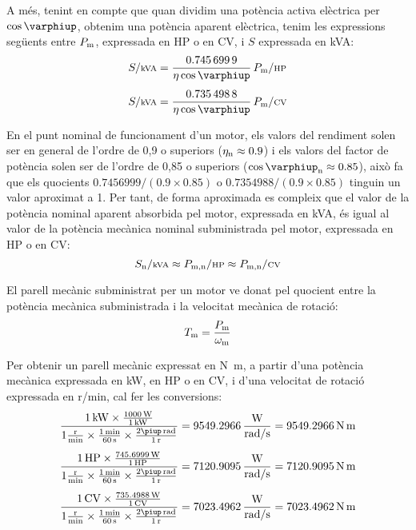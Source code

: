 A més, tenint en compte que quan dividim una potència activa elèctrica per $\cos\varphiup$, obtenim una potència aparent elèctrica, tenim les expressions següents entre $P\ped{m}$, expressada en HP o en CV, i $S$ expressada en kVA:
\begin{align}
    S/{\scriptstyle\si{kVA}} &= \frac{\num{0,7456999}}{\eta \cos\varphiup}\,   P\ped{m}/{\scriptstyle\si{HP}} \\[1ex]
    S/{\scriptstyle\si{kVA}} &= \frac{\num{0,7354988}}{\eta \cos\varphiup}\,   P\ped{m}/{\scriptstyle\si{CV}}
\end{align}

En el punt nominal de funcionament d'un motor, els valors del rendiment solen ser en general de l'ordre de 0,9 o superiors ($\eta\ped{n} \approx \num{0,9}$) i els valors del factor de potència solen ser de l'ordre de 0,85 o superiors ($\cos\varphiup\ped{n} \approx \num{0,85}$), això fa que els quocients $\num{0,7456999}/(\num{0,9} \times \num{0,85})$ o $\num{0,7354988}/(\num{0,9} \times \num{0,85})$ tinguin un valor aproximat a 1. Per tant, de forma aproximada es compleix que el valor de la potència nominal aparent absorbida pel motor, expressada en kVA, és igual al valor de la potència mecànica nominal subministrada pel motor, expressada en HP o en CV:
\begin{equation}\label{eq:kVA-CV-HP}
    S\ped{n}/{\scriptstyle \si{kVA}} \approx  P\ped{m,n}/{\scriptstyle \si{HP}} \approx  P\ped{m,n}/{\scriptstyle \si{CV}}
\end{equation}


El parell mecànic subministrat per un motor ve donat pel quocient entre la potència mecànica subministrada i la velocitat mecànica de rotació:
\begin{equation}\index{parell!mecànic}
    T\ped{m} = \frac{P\ped{m}}{\omega\ped{m}}\label{eq:T-P-w}
\end{equation}

Per  obtenir un  parell mecànic expressat en \si{N.m}, a partir d'una potència mecànica expressada en kW, en HP o en CV, i d'una velocitat de rotació expressada en \si{r/min}, cal  fer les conversions:
\begin{subequations}
\begin{align}
    \frac{\SI{1}{kW} \times \frac{\SI{1000}{W}}{\SI{1}{kW}}}{1\frac{\si{r}}{\si{min}} \times \frac{\SI{1}{min}}{\SI{60}{s}} \times \frac{2\piup\,\si{rad}}{\SI{1}{r}}} &=  \num{9549,2966}\, \frac{\si{W}}{\si{rad/s}} = \SI{9549,2966}{N.m} \\[1ex]
    \frac{\SI{1}{HP} \times \frac{\SI{745,6999}{W}}{\SI{1}{HP}}}{1\frac{\si{r}}{\si{min}} \times \frac{\SI{1}{min}}{\SI{60}{s}} \times \frac{2\piup\,\si{rad}}{\SI{1}{r}}} &=  \num{7120,9095}\, \frac{\si{W}}{\si{rad/s}} = \SI{7120,9095}{N.m} \\[1ex]
    \frac{\SI{1}{CV} \times \frac{\SI{735,4988}{W}}{\SI{1}{CV}}}{1\frac{\si{r}}{\si{min}} \times \frac{\SI{1}{min}}{\SI{60}{s}} \times \frac{2\piup\,\si{rad}}{\SI{1}{r}}} &=  \num{7023,4962}\, \frac{\si{W}}{\si{rad/s}} = \SI{7023,4962}{N.m}
\end{align}
\end{subequations}

